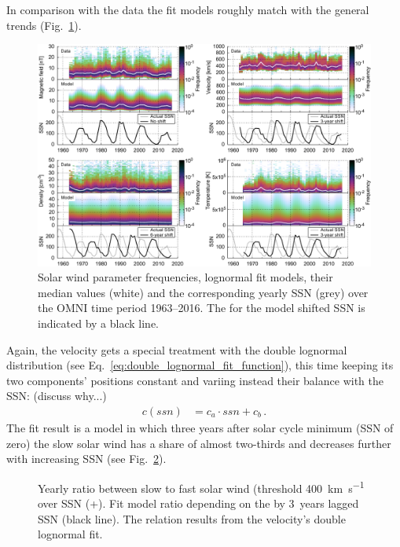 In comparison with the data the fit models roughly match with the general trends (Fig.~\ref{fig:OMNI_yearly_BVNTSSN_fit_c_plot}).\\
\begin{figure}
	\includegraphics[width=18cm]{figures/OMNI_yearly_BVNTSSN_fit_c_plot.pdf}
	\caption{Solar wind parameter frequencies, lognormal fit models, their median values (white) and the corresponding yearly SSN (grey) over the OMNI time period 1963--2016. The for the model shifted SSN is indicated by a black line.}
	\label{fig:OMNI_yearly_BVNTSSN_fit_c_plot}
\end{figure}

Again, the velocity gets a special treatment with the double lognormal distribution (see Eq.~\ref{eq:double_lognormal_fit_function}), this time keeping its two components' positions constant and variing instead their balance with the SSN:	(discuss why...)
\begin{align}
	c(ssn) &= c_a \cdot ssn + c_b\,.
\end{align}
The fit result is a model in which three years after solar cycle minimum (SSN of zero) the slow solar wind has a share of almost two-thirds and decreases further with increasing SSN (see Fig.~\ref{fig:Vdbl_SSN_ratio_b_plot}).\\
\begin{figure}
	\caption{Yearly ratio between slow to fast solar wind (threshold \SI{400}{\km\per\s} over SSN (+). Fit model ratio depending on the by 3~years lagged SSN (black line). The relation results from the velocity's double lognormal fit.}
	\label{fig:Vdbl_SSN_ratio_b_plot}
\end{figure}

